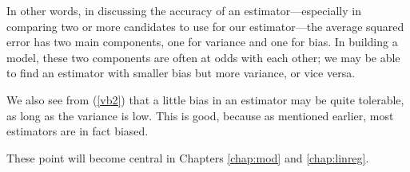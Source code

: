 In other words, in discussing the accuracy of an estimator---especially
in comparing two or more candidates to use for our estimator---the
average squared error has two main components, one for variance and one
for bias.  In building a model, these two components are often at odds
with each other; we may be able to find an estimator with smaller bias
but more variance, or vice versa.

We also see from (\ref{vb2}) that a little bias in an estimator
may be quite tolerable, as long as the variance is low.  This is good,
because as mentioned earlier, most estimators are in fact biased.

These point will become central in Chapters \ref{chap:mod} and
\ref{chap:linreg}.


% 
% 
% 
% 
% 
